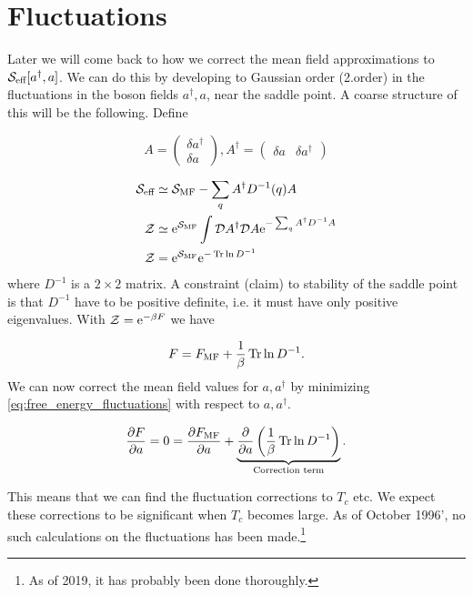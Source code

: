 \section{Fluctuations}
Later we will come back to how we correct the mean field approximations to \(\mathcal{S}_{\text{eff}}[a^\dagger, a]\). We can do this by developing to Gaussian order  (2.order) in the fluctuations in the boson fields \(a^\dagger, a\), near the saddle point. A coarse structure of this will be the following. Define 

\begin{equation}
A = 
\begin{pmatrix}
\delta a^\dagger \\
\delta a
\end{pmatrix}, 
A^\dagger =
\begin{pmatrix}
\delta a & \delta a^\dagger
\end{pmatrix}
\end{equation}

\begin{align}
\mathcal{S}_{\text{eff}} &\simeq \mathcal{S}_{\text{MF}} - \sum_q A^\dagger D^{-1}(q)A \nonumber\\
\mathcal{Z} &\simeq \mathrm{e}^{\mathcal{S}_{\text{MF}}}\int\mathcal{D} A^\dagger\mathcal{D} A\mathrm{e}^{- \sum_q A^\dagger D^{-1}A}\nonumber  \\
\mathcal{Z} &= \mathrm{e}^{\mathcal{S}_{\text{MF}}}\mathrm{e}^{-\Tr\ln D^{-1}} \label{eq:partition_fluctuations}
\end{align} where $D^{-1}$ is a \(2\times 2\) matrix. A constraint (claim) to stability of the saddle point is that $D^{-1}$ have to be positive definite, i.e. it must have only positive eigenvalues. 
With $\mathcal{Z} = \mathrm{e}^{-\beta F}$  we have 

\begin{equation}
\label{eq:free_energy_fluctuations}
F = F_{\text{MF}} + \frac{1}{\beta}\Tr\ln D^{-1}.
\end{equation}
We can now correct  the mean field values for $a, a^\dagger$ by minimizing \eqref{eq:free_energy_fluctuations} with respect to $a, a^\dagger$.

\begin{equation}
\pdv{F}{a} =0 = \pdv{F_{\text{MF}}}{a} + \underbrace{\pdv{a}\left(\frac{1}{\beta}\Tr\ln D^{-1}\right)}_{\text{Correction term}}.
\end{equation}

This means that we can find the fluctuation corrections to $T_c$ etc. We expect these corrections to be significant when $T_c$ becomes large. As of October 1996', no such calculations on the fluctuations has been made.\footnote{As of 2019, it has probably been done thoroughly.}